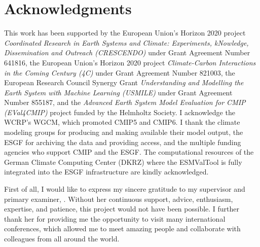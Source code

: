 
%



\chapter{Acknowledgments}

This work has been supported by the European Union's Horizon 2020 project
\emph{Coordinated Research in Earth Systems and Climate: Experiments,
  kNowledge, Dissemination and Outreach (CRESCENDO)} under Grant Agreement
Number 641816, the European Union's Horizon 2020 project \emph{Climate-Carbon
  Interactions in the Coming Century (4C)} under Grant Agreement Number 821003,
the European Research Council Synergy Grant \emph{Understanding and Modelling
  the Earth System with Machine Learning (USMILE)} under Grant Agreement Number
855187, and the \emph{Advanced Earth System Model Evaluation for CMIP
  (EVal4CMIP)} project funded by the Helmholtz Society. I acknowledge the
\ac{WCRP}'s \ac{WGCM}, which promoted \acs{CMIP}5 and \acs{CMIP}6. I thank the
climate modeling groups for producing and making available their model output,
the \ac{ESGF} for archiving the data and providing access, and the multiple
funding agencies who support \ac{CMIP} and the \ac{ESGF}. The computational
resources of the German Climate Computing Center (DKRZ) where the
\ac{ESMValTool} is fully integrated into the \ac{ESGF} infrastructure are
kindly acknowledged.

\vspace{\baselineskip}

First of all, I would like to express my sincere gratitude to my supervisor and
primary examiner, \ThePrimaryExaminer{}. Without her continuous support,
advice, enthusiasm, expertise, and patience, this \PhD{} project would not have
been possible. I further thank her for providing me the opportunity to visit
many international conferences, which allowed me to meet amazing people and
collaborate with colleagues from all around the world.

